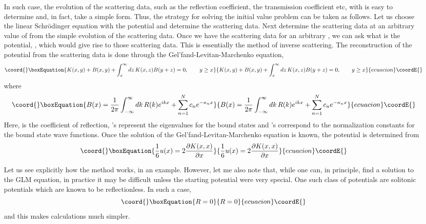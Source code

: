 \documentclass[a4paper,11pt]{article}
\begin{document}
In such case, the evolution of the scattering data, such as the
reflection coefficient, the transmission coefficient etc, with \coordHE{} is
easy to determine and, in fact, take a simple form. Thus, the strategy
for solving the initial value problem can be taken as follows. Let us
choose the linear Schr\"{o}dinger equation with the potential \coordHE{} and determine the scattering data. Next determine the
scattering data at an arbitrary value of \coordHE{} from the simple evolution
of the scattering data. Once we have the scattering data for an
arbitrary \coordHE{}, we can ask what is the potential, \coordHE{}, which would give
rise to those scattering data. This is essentially the method of
inverse scattering. The reconstruction of the potential from the
scattering data is done through the Gel'fand-Levitan-Marchenko
equation,
\begin{equation}\coord{}\boxEquation{
K(x,y) + B(x,y) + \int_{x}^{\infty} dz\,K(x,z) B(y+z) = 0,\qquad y\geq
x
}{
K(x,y) + B(x,y) + \int_{x}^{\infty} dz\,K(x,z) B(y+z) = 0,\qquad y\geq
x
}{ecuacion}\coordE{}\end{equation}
where
\begin{equation}\coord{}\boxEquation{
B(x) = {1\over 2\pi} \int_{-\infty}^{\infty} dk\,R(k) e^{ikx} +
\sum_{n=1}^{N} c_{n} e^{-\kappa_{n} x}
}{
B(x) = {1\over 2\pi} \int_{-\infty}^{\infty} dk\,R(k) e^{ikx} +
\sum_{n=1}^{N} c_{n} e^{-\kappa_{n} x}
}{ecuacion}\coordE{}\end{equation}
Here, \coordHE{} is the coefficient of reflection, \coordHE{}'s represent the
eigenvalues for the bound states and \coordHE{}'s correspond to the
normalization constants for the bound state wave functions. Once the
solution of the Gel'fand-Levitan-Marchenko equation is known, the
potential is determined from
\begin{equation}\coord{}\boxEquation{
{1\over 6} u(x) = 2 {\partial K(x,x)\over \partial x}
}{
{1\over 6} u(x) = 2 {\partial K(x,x)\over \partial x}
}{ecuacion}\coordE{}\end{equation}

Let us see explicitly how the method works, in an example. However,
let me also note that, while one can, in principle, find a solution to
the GLM equation, in practice it may be difficult unless the starting
potential were very special. One such class of potentials are
solitonic potentials which are known to be reflectionless. In such a
case,
\begin{equation}\coord{}\boxEquation{
R = 0
}{
R = 0
}{ecuacion}\coordE{}\end{equation}
and this makes calculations much simpler.
\end{document}
